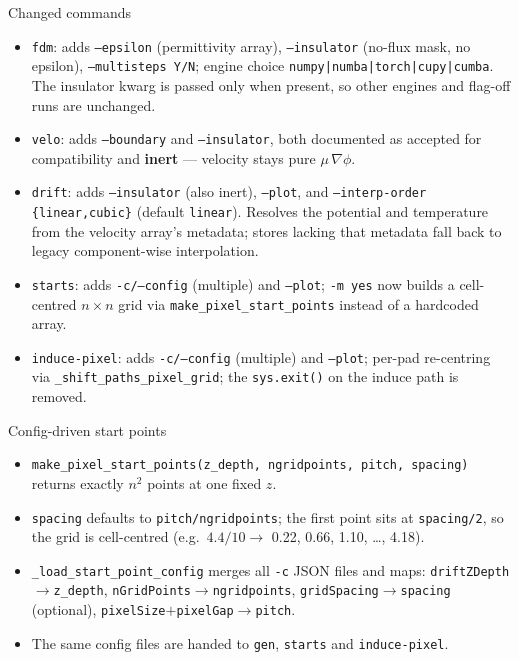 \documentclass[10pt,aspectratio=169]{beamer}
\newcommand{\ti}[1]{\texttt{\footnotesize #1}}
\begin{document}
\begin{frame}[allowframebreaks]{Changed commands}
  \begin{itemize}\small
  \item \ti{fdm}: adds \ti{--epsilon} (permittivity array), \ti{--insulator} (no-flux mask,
        no epsilon), \ti{--multisteps Y/N}; engine choice
        \ti{numpy|numba|torch|cupy|cumba}. The insulator kwarg is passed only when present,
        so other engines and flag-off runs are unchanged.
  \item \ti{velo}: adds \ti{--boundary} and \ti{--insulator}, both documented as accepted
        for compatibility and \textbf{inert} --- velocity stays pure $\mu\,\nabla\phi$.
  \item \ti{drift}: adds \ti{--insulator} (also inert), \ti{--plot}, and
        \ti{--interp-order \{linear,cubic\}} (default \ti{linear}). Resolves the potential
        and temperature from the velocity array's metadata; stores lacking that metadata
        fall back to legacy component-wise interpolation.
  \item \ti{starts}: adds \ti{-c/--config} (multiple) and \ti{--plot}; \ti{-m yes} now
        builds a cell-centred $n\times n$ grid via \ti{make\_pixel\_start\_points} instead of
        a hardcoded array.
  \item \ti{induce-pixel}: adds \ti{-c/--config} (multiple) and \ti{--plot}; per-pad
        re-centring via \ti{\_shift\_paths\_pixel\_grid}; the \ti{sys.exit()} on the induce
        path is removed.
  \end{itemize}
\end{frame}

\begin{frame}{Config-driven start points}
  \begin{itemize}\small
  \item \ti{make\_pixel\_start\_points(z\_depth, ngridpoints, pitch, spacing)} returns
        exactly $n^2$ points at one fixed $z$.
  \item \ti{spacing} defaults to \ti{pitch/ngridpoints}; the first point sits at
        \ti{spacing/2}, so the grid is cell-centred
        (e.g.\ $4.4/10\rightarrow$ 0.22, 0.66, 1.10, \ldots, 4.18).
  \item \ti{\_load\_start\_point\_config} merges all \ti{-c} JSON files and maps:
        \ti{driftZDepth}$\rightarrow$\ti{z\_depth},
        \ti{nGridPoints}$\rightarrow$\ti{ngridpoints},
        \ti{gridSpacing}$\rightarrow$\ti{spacing} (optional),
        \ti{pixelSize}$+$\ti{pixelGap}$\rightarrow$\ti{pitch}.
  \item The same config files are handed to \ti{gen}, \ti{starts} and \ti{induce-pixel}.
  \end{itemize}
\end{frame}
\end{document}

